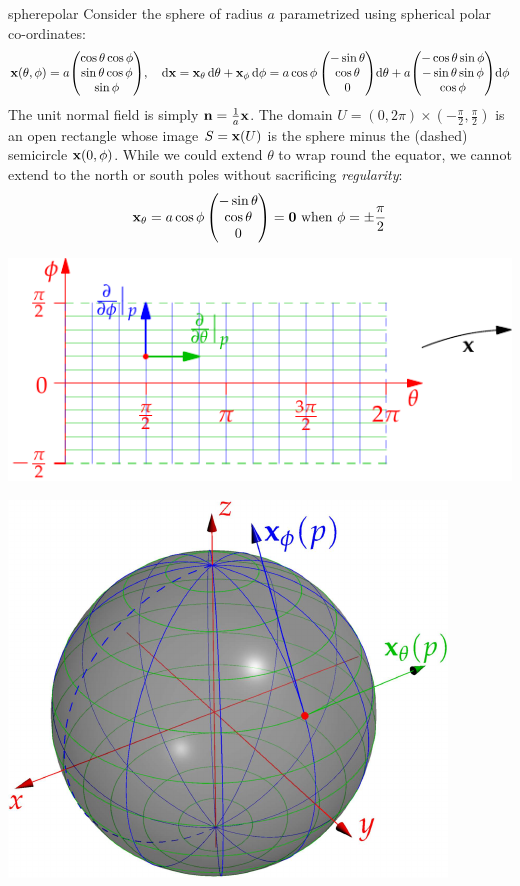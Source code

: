 \begin{example}{}{spherepolar}
	Consider the sphere of radius $a$ parametrized using spherical polar co-ordinates:
	\[
		{\mathbf{x}}(\theta,\phi) 
			=a\!\begin{pmatrix}\cos\theta\cos\phi\\\sin\theta\cos\phi\\\sin\phi\end{pmatrix}\!,\quad \mathrm{d}{\mathbf{x}} ={\mathbf{x}}_\theta\,{\mathrm{d}\theta}+{\mathbf{x}}_\phi\,\mathrm{d}\phi 
			=a\cos\phi\begin{pmatrix}-\sin\theta\\\cos\theta\\0\end{pmatrix}\!{\mathrm{d}\theta} +a\!\begin{pmatrix}-\cos\theta\sin\phi\\-\sin\theta\sin\phi\\\cos\phi\end{pmatrix}\!\mathrm{d}\phi
	\]
	The unit normal field is simply ${\mathbf{n}}=\frac 1a{\mathbf{x}}$. The domain $U=(0,2\pi)\times(-\frac\pi 2,\frac\pi 2)$ is an open rectangle whose image $S={\mathbf{x}}(U)$ is the sphere minus the (dashed) semicircle ${\mathbf{x}}(0,\phi)$. While we could extend $\theta$ to wrap round the equator, we cannot extend to the north or south poles without sacrificing \emph{regularity}:
	\[
		{\mathbf{x}}_\theta=a\cos\phi\begin{pmatrix}-\sin\theta\\\cos\theta\\0\end{pmatrix}=\mathbf{0}\text{ when }\phi=\pm\frac\pi 2
	\]
	\begin{minipage}{0.55\linewidth}\vspace{5pt}
		\hfill\includegraphics[scale=0.95]{surfaces-sphere2}
	\end{minipage}
	\hfill
	\begin{minipage}{0.44\linewidth}\vspace{-55pt}
		\flushright	\href{http://www.math.uci.edu/~ndonalds/math162a/surfaces-sphere.html}{\includegraphics[scale=0.9]{surfaces-sphere}}

\end{minipage}
\end{example}
